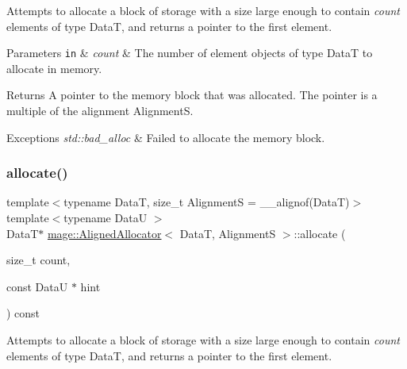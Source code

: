 Attempts to allocate a block of storage with a size large enough to contain {\itshape count} elements of type {\ttfamily DataT}, and returns a pointer to the first element.


\begin{DoxyParams}[1]{Parameters}
\mbox{\tt in}  & {\em count} & The number of element objects of type {\ttfamily DataT} to allocate in memory. \\
\hline
\end{DoxyParams}
\begin{DoxyReturn}{Returns}
A pointer to the memory block that was allocated. The pointer is a multiple of the alignment {\ttfamily AlignmentS}. 
\end{DoxyReturn}

\begin{DoxyExceptions}{Exceptions}
{\em std\+::bad\+\_\+alloc} & Failed to allocate the memory block. \\
\hline
\end{DoxyExceptions}
\hypertarget{structmage_1_1_aligned_allocator_ae7369bc87b8720a0433f8ceda2a52218}{}\label{structmage_1_1_aligned_allocator_ae7369bc87b8720a0433f8ceda2a52218} 
\subsubsection{\texorpdfstring{allocate()}{allocate()}\hspace{0.1cm}{\footnotesize\ttfamily [2/2]}}
{\footnotesize\ttfamily template$<$typename DataT, size\+\_\+t AlignmentS = \+\_\+\+\_\+alignof(\+Data\+T)$>$ \\
template$<$typename DataU $>$ \\
DataT$\ast$ \hyperlink{structmage_1_1_aligned_allocator}{mage\+::\+Aligned\+Allocator}$<$ DataT, AlignmentS $>$\+::allocate (\begin{DoxyParamCaption}\item[{size\+\_\+t}]{count,  }\item[{const DataU $\ast$}]{hint }\end{DoxyParamCaption}) const}

Attempts to allocate a block of storage with a size large enough to contain {\itshape count} elements of type {\ttfamily DataT}, and returns a pointer to the first element.



